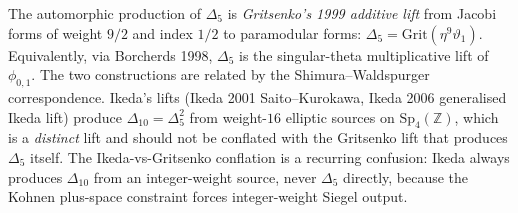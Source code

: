 \begin{remark}
\label{rem:k3e-gritsenko-not-ikeda}
The automorphic production of $\Delta_5$ is \emph{Gritsenko's 1999 additive lift} from
Jacobi forms of weight $9/2$ and index $1/2$ to paramodular forms:
$\Delta_5 = \mathrm{Grit}(\eta^9\vartheta_1)$. Equivalently, via Borcherds 1998,
$\Delta_5$ is the singular-theta multiplicative lift of $\phi_{0,1}$. The two
constructions are related by the Shimura--Waldspurger correspondence. Ikeda's lifts
(Ikeda 2001 Saito--Kurokawa, Ikeda 2006 generalised Ikeda lift) produce
$\Delta_{10} = \Delta_5^2$ from weight-$16$ elliptic sources on $\mathrm{Sp}_4(\mathbb{Z})$,
which is a \emph{distinct} lift and should not be conflated with the Gritsenko lift
that produces $\Delta_5$ itself. The Ikeda-vs-Gritsenko conflation is a recurring
confusion: Ikeda always produces $\Delta_{10}$ from an integer-weight source,
never $\Delta_5$ directly, because the Kohnen plus-space constraint forces
integer-weight Siegel output.
\end{remark}


